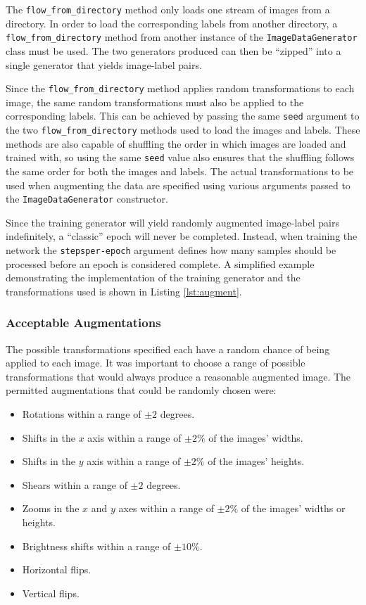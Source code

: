 The \texttt{flow\_from\_directory} method only loads one stream of images from a directory. In order to load the corresponding labels from another directory, a \texttt{flow\_from\_directory} method from another instance of the \texttt{ImageDataGenerator} class must be used. The two generators produced can then be ``zipped'' into a single generator that yields image-label pairs.

Since the \texttt{flow\_from\_directory} method applies random transformations to each image, the same random transformations must also be applied to the corresponding labels. This can be achieved by passing the same \texttt{seed} argument to the two \texttt{flow\_from\_directory} methods used to load the images and labels. These methods are also capable of shuffling the order in which images are loaded and trained with, so using the same \texttt{seed} value also ensures that the shuffling follows the same order for both the images and labels. The actual transformations to be used when augmenting the data are specified using various arguments passed to the \texttt{ImageDataGenerator} constructor.

Since the training generator will yield randomly augmented image-label pairs indefinitely, a ``classic'' epoch will never be completed. Instead, when training the network the \texttt{steps\-per-epoch} argument defines how many samples should be processed before an epoch is considered complete. A simplified example demonstrating the implementation of the training generator and the transformations used is shown in Listing \ref{lst:augment}.

\subsubsection{Acceptable Augmentations}

The possible transformations specified each have a random chance of being applied to each image. It was important to choose a range of possible transformations that would always produce a reasonable augmented image. The permitted augmentations that could be randomly chosen were:

\begin{itemize}
    \item Rotations within a range of $\pm 2$ degrees.
    \item Shifts in the $x$ axis within a range of $\pm 2\%$ of the images' widths.
    \item Shifts in the $y$ axis within a range of $\pm 2\%$ of the images' heights.
    \item Shears within a range of $\pm 2$ degrees.
    \item Zooms in the $x$ and $y$ axes within a range of $\pm 2\%$ of the images' widths or heights.
    \item Brightness shifts within a range of $\pm 10\%$.
    \item Horizontal flips.
    \item Vertical flips.
\end{itemize}

